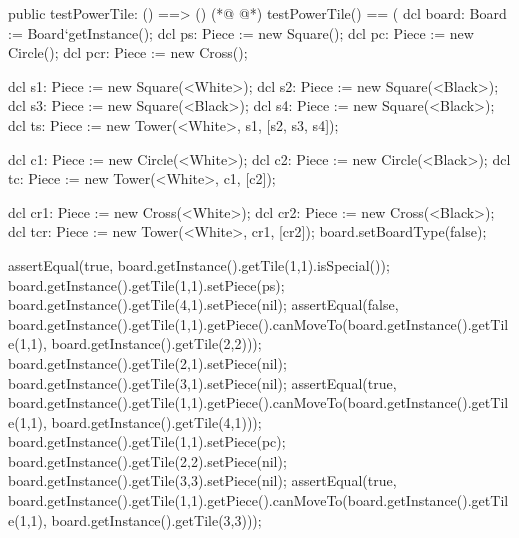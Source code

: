 \begin{vdmpp}[breaklines=true]
  public testPowerTile: () ==> ()
(*@
\label{testPowerTile:136}
@*)
  testPowerTile() == (
   dcl board: Board := Board`getInstance();
   dcl ps: Piece := new Square();
   dcl pc: Piece := new Circle();
   dcl pcr: Piece := new Cross();
   
   dcl s1: Piece := new Square(<White>);
   dcl s2: Piece := new Square(<Black>);
   dcl s3: Piece := new Square(<Black>);
   dcl s4: Piece := new Square(<Black>);
   dcl ts: Piece := new Tower(<White>, s1, [s2, s3, s4]);
   
   dcl c1: Piece := new Circle(<White>);
   dcl c2: Piece := new Circle(<Black>);
   dcl tc: Piece := new Tower(<White>, c1, [c2]);
   
   dcl cr1: Piece := new Cross(<White>);
   dcl cr2: Piece := new Cross(<Black>);
   dcl tcr: Piece := new Tower(<White>, cr1, [cr2]);
   board.setBoardType(false);
   
   assertEqual(true, board.getInstance().getTile(1,1).isSpecial());
   board.getInstance().getTile(1,1).setPiece(ps);
   board.getInstance().getTile(4,1).setPiece(nil);
   assertEqual(false, board.getInstance().getTile(1,1).getPiece().canMoveTo(board.getInstance().getTile(1,1), board.getInstance().getTile(2,2)));
   board.getInstance().getTile(2,1).setPiece(nil);
   board.getInstance().getTile(3,1).setPiece(nil);
   assertEqual(true, board.getInstance().getTile(1,1).getPiece().canMoveTo(board.getInstance().getTile(1,1), board.getInstance().getTile(4,1)));
   board.getInstance().getTile(1,1).setPiece(pc);
   board.getInstance().getTile(2,2).setPiece(nil);
   board.getInstance().getTile(3,3).setPiece(nil);
   assertEqual(true, board.getInstance().getTile(1,1).getPiece().canMoveTo(board.getInstance().getTile(1,1), board.getInstance().getTile(3,3)));
   

\end{vdmpp}
